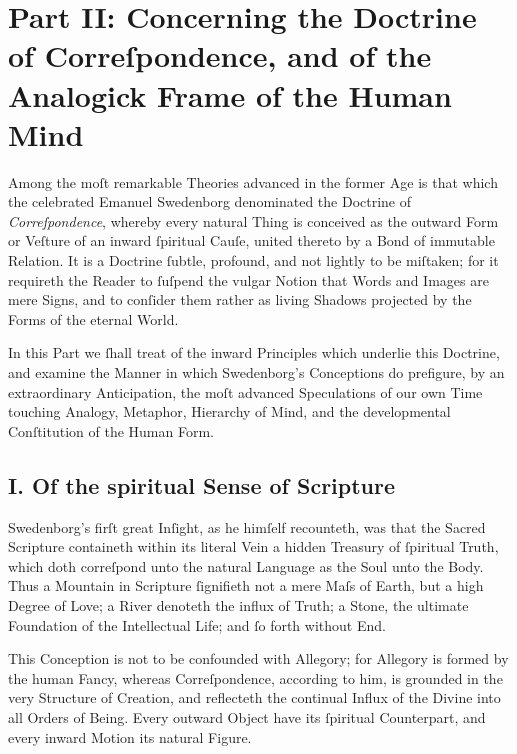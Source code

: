 \documentclass[12pt]{article}
\begin{document}
\newpage

\section*{Part II: Concerning the Doctrine of Correſpondence, and of the Analogick Frame of the Human Mind}


Among the moſt remarkable Theories advanced in the former Age is that which 
the celebrated Emanuel Swedenborg denominated the Doctrine of 
\textit{Correſpondence}, whereby every natural Thing is conceived as the 
outward Form or Veſture of an inward ſpiritual Cauſe, united thereto by a Bond 
of immutable Relation. It is a Doctrine ſubtle, profound, and not lightly to be 
miſtaken; for it requireth the Reader to ſuſpend the vulgar Notion that Words 
and Images are mere Signs, and to conſider them rather as living Shadows 
projected by the Forms of the eternal World.

In this Part we ſhall treat of the inward Principles which underlie this 
Doctrine, and examine the Manner in which Swedenborg’s Conceptions do 
prefigure, by an extraordinary Anticipation, the moſt advanced Speculations of 
our own Time touching Analogy, Metaphor, Hierarchy of Mind, and the 
developmental Conſtitution of the Human Form.

\subsection*{I. Of the spiritual Sense of Scripture}

Swedenborg’s firſt great Inſight, as he himſelf recounteth, was that the Sacred 
Scripture containeth within its literal Vein a hidden Treasury of ſpiritual 
Truth, which doth correſpond unto the natural Language as the Soul unto the 
Body. Thus a Mountain in Scripture ſignifieth not a mere Maſs of Earth, but a 
high Degree of Love; a River denoteth the influx of Truth; a Stone, the ultimate 
Foundation of the Intellectual Life; and ſo forth without End.

This Conception is not to be confounded with Allegory; for Allegory is formed 
by the human Fancy, whereas Correſpondence, according to him, is grounded in 
the very Structure of Creation, and reflecteth the continual Influx of the 
Divine into all Orders of Being. Every outward Object have its ſpiritual 
Counterpart, and every inward Motion its natural Figure.
\end{document}
